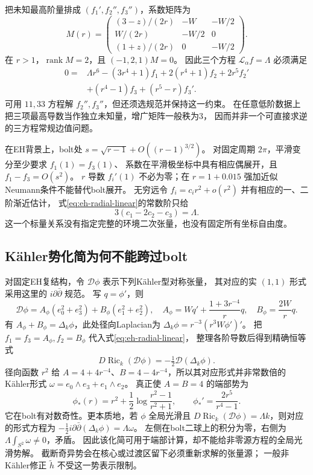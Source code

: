 \documentclass[UTF8,a4paper,11pt,fontset=fandol]{ctexart}
\numberwithin{equation}{section}
\theoremstyle{definition}
\newcommand{\Ric}{\operatorname{Ric}}
\begin{document}
把未知最高阶量排成 $(f_1',f_2'',f_3'')$，系数矩阵为
\[
M(r)=\begin{pmatrix}
(3-z)/(2r)&-W&-W/2\\
W/(2r)&-W/2&0\\
(1+z)/(2r)&0&-W/2
\end{pmatrix}.
\]
在 $r>1$，$\operatorname{rank}M=2$，且 $(-1,2,1)M=0$。
因此三个方程 $\mathscr L_\alpha f=\Lambda$ 必须满足
\begin{equation}\label{eq:eh-radial-constraint}
\begin{split}
0={}&\Lambda r^6-(3r^4+1)f_1+2(r^4+1)f_2+2r^5f_2'\\
&+(r^4-1)f_3+(r^5-r)f_3'.
\end{split}
\end{equation}
可用 $11,33$ 方程解 $f_2'',f_3''$，但还须选规范并保持这一约束。
在任意低阶数据上把三项最高导数当作独立未知量，增广矩阵一般秩为3，
因而并非一个可直接求逆的三方程常规边值问题。

在EH背景上，bolt处 $s=\sqrt{r-1}+O((r-1)^{3/2})$。
对固定周期 $2\pi$，平滑变分至少要求 $f_1(1)=f_3(1)$、
系数在平滑极坐标中具有相应偶展开，且 $f_1-f_3=O(s^2)$。
$r$ 导数 $f_i'(1)$ 不必为零；在 $r=1+0.015$ 强加近似Neumann条件不能替代bolt展开。
无穷远令 $f_i=c_ir^2+o(r^2)$ 并有相应的一、二阶渐近估计，
式\eqref{eq:eh-radial-linear}的常数阶只给
\begin{equation}\label{eq:eh-quadratic-relation}
3(c_1-2c_2-c_3)=\Lambda.
\end{equation}
这一个标量关系没有指定完整的环境二次张量，也没有固定所有坐标自由度。

\subsection{K\"ahler势化简为何不能跨过bolt}
对固定EH复结构，令 $\mathscr D\phi$ 表示下列K\"ahler型对称张量，
其对应的实 $(1,1)$ 形式采用这里的 $i\partial\bar\partial$ 规范。
写 $q=\phi'$，则
\[
\mathscr D\phi=A_\phi(e_0^2+e_3^2)+B_\phi(e_1^2+e_2^2),\quad
A_\phi=Wq'+\frac{1+3r^{-4}}r q,\quad B_\phi=\frac{2W}r q.
\]
有 $A_\phi+B_\phi=\Delta_k\phi$，此处径向Laplacian为
$\Delta_k\phi=r^{-3}(r^3W\phi')'$。
把 $f_1=f_3=A_\phi,f_2=B_\phi$ 代入式\eqref{eq:eh-radial-linear}，
整理各阶导数后得到精确恒等式
\begin{equation}\label{eq:eh-kahler-identity}
D\Ric_k(\mathscr D\phi)=-\tfrac12\mathscr D(\Delta_k\phi).
\end{equation}
径向函数 $r^2$ 给 $A=4+4r^{-4}$、$B=4-4r^{-4}$，所以其对应形式并非常数倍的K\"ahler形式
$\omega=e_0\wedge e_3+e_1\wedge e_2$。
真正使 $A=B=4$ 的端部势为
\[
\phi_*(r)=r^2+\frac12\log\frac{r^2-1}{r^2+1},\qquad
\phi_*'=\frac{2r^5}{r^4-1}.
\]
它在bolt有对数奇性。更本质地，若 $\phi$ 全局光滑且
$D\Ric_k(\mathscr D\phi)=\Lambda k$，则对应的形式方程为
$-\frac12i\partial\bar\partial(\Delta_k\phi)=\Lambda\omega$。
左侧在bolt二球上的积分为零，右侧为
$\Lambda\int_{S^2}\omega\ne0$，矛盾。
因此该化简可用于端部计算，却不能给非零源方程的全局光滑势解。
截断奇异势会在核心或过渡区留下必须重新求解的张量源；
一般非K\"ahler修正 $\widetilde h$ 不受这一势表示限制。
\end{document}
